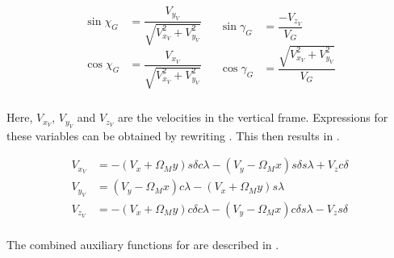 \begin{align} \label{eq:velAngl}
\begin{split}
\sin \chi_{G} &= \dfrac{V_{y_{V}}}{\sqrt{V_{x_{V}}^{2}+V_{y_{V}}^{2}}} \\
\cos \chi_{G} &= \dfrac{V_{x_{V}}}{\sqrt{V_{x_{V}}^{2}+V_{y_{V}}^{2}}} \\
\end{split}
&
\begin{split}
\sin \gamma_{G} &= \dfrac{-V_{z_{V}}}{V_{G}}\\
\cos \gamma_{G} &= \dfrac{\sqrt{V_{x_{V}}^{2}+V_{y_{V}}^{2}}}{V_{G}}\\
\end{split} 
\end{align} 


Here, $V_{x_{V}}$, $V_{y_{V}}$ and $V_{z_{V}}$ are the velocities in the vertical frame. Expressions for these variables can be obtained by rewriting . This then results in .


\begin{equation} \label{eq:VV}
\begin{split}
V_{x_{V}} & = -\left(V_{x}+\Omega_{M}y\right) s \delta c\lambda - \left(V_{y}-\Omega_{M}x\right) s\delta s\lambda+V_{z}c\delta \\
V_{y_{V}} & = \left(V_{y}-\Omega_{M}x\right) c\lambda - \left(V_{x}+\Omega_{M} y \right) s\lambda \\
V_{z_{V}} & = -\left(V_{x}+\Omega_{M}y\right)c\delta c\lambda-\left(V_{y}-\Omega_{M}x\right) c\delta s\lambda - V_{z} s\delta \\
\end{split}
\end{equation}

The combined auxiliary functions for  are described in .

